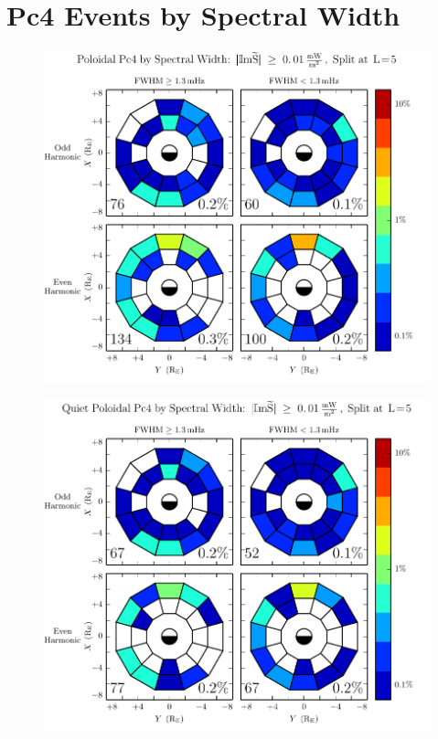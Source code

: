 \section{Pc4 Events by Spectral Width}


\begin{figure}[!htb]
    \centering
    \includegraphics[width=\textwidth]{figures/fwhm_rate_p_all.pdf}
    \caption[Poloidal Pc4 Rate by Compressional Coupling]{
      \todo{$\cdots$}
    }
    \label{fig_fwhm_rate_p_all}
\end{figure}

\begin{figure}[!htb]
    \centering
    \includegraphics[width=\textwidth]{figures/fwhm_rate_p_calm.pdf}
    \caption[Poloidal Pc4 Rate by Compressional Coupling: Dst$\geq \SI{-30}{\nT}$]{
      \todo{$\cdots$}
    }
    \label{fig_fwhm_rate_p_calm}
\end{figure}

